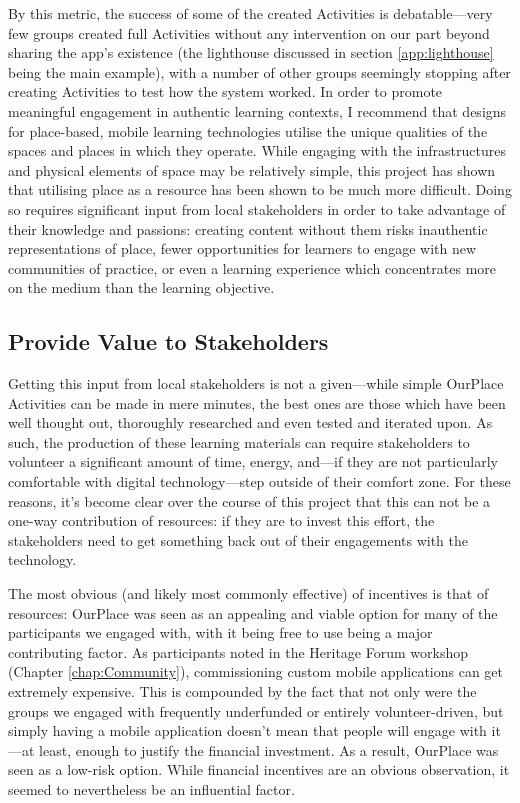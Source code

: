 By this metric, the success of some of the created Activities is debatable---very few groups created full Activities without any intervention on our part beyond sharing the app's existence (the lighthouse discussed in section \ref{app:lighthouse} being the main example), with a number of other groups seemingly stopping after creating Activities to test how the system worked. In order to promote meaningful engagement in authentic learning contexts, I recommend that designs for place-based, mobile learning technologies utilise the unique qualities of the spaces and places in which they operate. While engaging with the infrastructures and physical elements of space may be relatively simple, this project has shown that utilising place as a resource has been shown to be much more difficult. Doing so requires significant input from local stakeholders in order to take advantage of their knowledge and passions: creating content without them risks inauthentic representations of place, fewer opportunities for learners to engage with new communities of practice, or even a learning experience which concentrates more on the medium than the learning objective. 

\subsection{Provide Value to Stakeholders}

Getting this input from local stakeholders is not a given---while simple OurPlace Activities can be made in mere minutes, the best ones are those which have been well thought out, thoroughly researched and even tested and iterated upon. As such, the production of these learning materials can require stakeholders to volunteer a significant amount of time, energy, and---if they are not particularly comfortable with digital technology---step outside of their comfort zone. For these reasons, it's become clear over the course of this project that this can not be a one-way contribution of resources: if they are to invest this effort, the stakeholders need to get something back out of their engagements with the technology.

The most obvious (and likely most commonly effective) of incentives is that of resources: OurPlace was seen as an appealing and viable option for many of the participants we engaged with, with it being free to use being a major contributing factor. As participants noted in the Heritage Forum workshop (Chapter \ref{chap:Community}), commissioning custom mobile applications can get extremely expensive. This is compounded by the fact that not only were the groups we engaged with frequently underfunded or entirely volunteer-driven, but simply having a mobile application doesn't mean that people will engage with it---at least, enough to justify the financial investment. As a result, OurPlace was seen as a low-risk option. While financial incentives are an obvious observation, it seemed to nevertheless be an influential factor.

